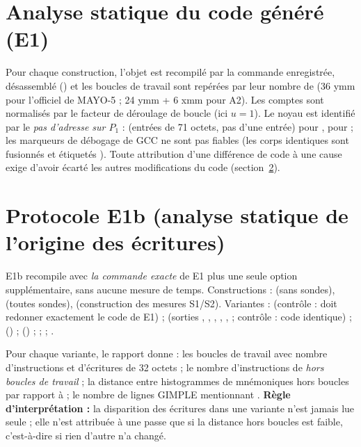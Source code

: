 \section{Analyse statique du code généré (E1)}
Pour chaque construction, l'objet est recompilé par la commande enregistrée, désassemblé () et les boucles de travail sont repérées par leur nombre de  (36 ymm pour l'officiel de MAYO-5 ; 24 ymm + 6 xmm pour A2). Les comptes sont normalisés par le facteur de déroulage de boucle (ici $u=1$). Le noyau est identifié par le \emph{pas d'adresse sur $P_1$} :  (entrées de 71 octets, pas d'une entrée) pour ,  pour  ; les marqueurs de débogage de GCC ne sont pas fiables (les corps identiques sont fusionnés et étiquetés ). Toute attribution d'une différence de code à une cause exige d'avoir écarté les autres modifications du code (section~\ref{sec:e1b}).

\section{Protocole E1b (analyse statique de l'origine des écritures)}\label{sec:e1b}
E1b recompile  avec \emph{la commande exacte} de E1 plus une seule option supplémentaire, sans aucune mesure de temps. Constructions :  (sans sondes),  (toutes sondes),  (construction des mesures S1/S2). Variantes :  (contrôle : doit redonner exactement le code de E1) ;  (sorties , , , , ,  ; contrôle : code identique) ;  () ;  () ;  ;  ; .

Pour chaque variante, le rapport donne : les boucles de travail avec nombre d'instructions et d'écritures de 32 octets ; le nombre d'instructions de  \emph{hors boucles de travail} ; la distance entre histogrammes de mnémoniques hors boucles par rapport à  ; le nombre de lignes GIMPLE mentionnant . \textbf{Règle d'interprétation :} la disparition des écritures dans une variante n'est jamais lue seule ; elle n'est attribuée à une passe que si la distance hors boucles est faible, c'est-à-dire si rien d'autre n'a changé.

